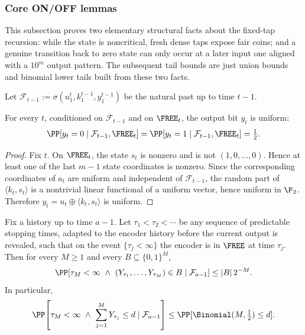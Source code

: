 \subsubsection{Core ON/OFF lemmas}
\label{subsec:inner-dense-onoff}

This subsection proves two elementary structural facts about the fixed-tap
recursion: while the state is noncritical, fresh dense taps expose fair coins;
and a genuine transition back to zero state can only occur at a later input one
aligned with a \(10^m\) output pattern.  The subsequent tail bounds are just
union bounds and binomial lower tails built from these two facts.

Let $\mathcal{F}_{t-1}:=\sigma(u_1^t,k_1^{t-1},y_1^{t-1})$ be the natural past up to time $t-1$.

\begin{lemma}
\label{lem:dense-fair-while-on}
For every $t$, conditioned on $\mathcal{F}_{t-1}$ and on $\FREE_t$, the output bit $y_t$ is uniform:
\[
\PP[y_t=0\mid \mathcal{F}_{t-1},\FREE_t]=\PP[y_t=1\mid \mathcal{F}_{t-1},\FREE_t]=\tfrac12.
\]
\end{lemma}

\begin{proof}
Fix $t$. On $\FREE_t$, the state \(s_t\) is nonzero and is not \((1,0,\dots,0)\). Hence at least one of the last
\(m-1\) state coordinates is nonzero. Since the corresponding coordinates of \(a_t\) are uniform and independent of
\(\mathcal{F}_{t-1}\), the random part of \(\langle k_t,s_t\rangle\) is a nontrivial linear functional of a uniform
vector, hence uniform in \(\F_2\). Therefore \(y_t=u_t\oplus\langle k_t,s_t\rangle\) is uniform.
\end{proof}

\begin{lemma}
\label{lem:dense-on-time-domination}
Fix a history up to time \(a-1\). Let
\(\tau_1<\tau_2<\cdots\) be any sequence of predictable stopping times, adapted to the encoder history before the
current output is revealed, such that on the event \(\{\tau_j<\infty\}\) the encoder is in \(\FREE\) at time
\(\tau_j\). Then
for every \(M\ge 1\) and every \(B\subseteq\{0,1\}^M\),
\[
\PP\!\left[
\tau_M<\infty\ \wedge\ (Y_{\tau_1},\dots,Y_{\tau_M})\in B
\mid \mathcal{F}_{a-1}
\right]
\le
|B|\,2^{-M}.
\]
In particular,
\[
\PP\!\left[
\tau_M<\infty\ \wedge\ \sum_{j=1}^M Y_{\tau_j}\le d
\mid \mathcal{F}_{a-1}
\right]
\le
\PP[\Binomial(M,\tfrac12)\le d].
\]
\end{lemma}

